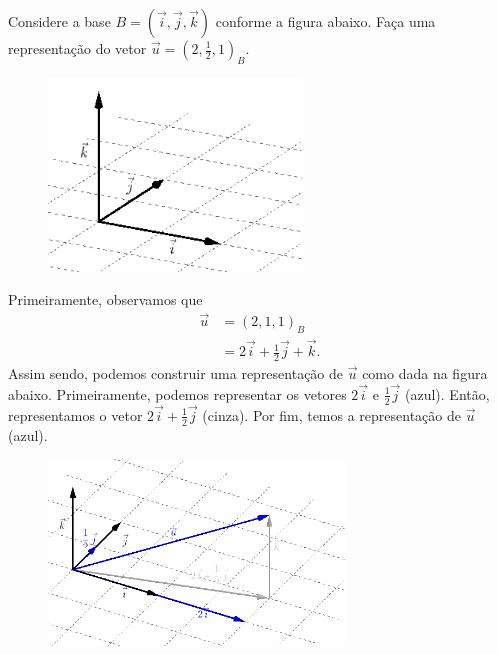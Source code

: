 \begin{exeresol}
  Considere a base $B=(\vec{i}, \vec{j}, \vec{k})$ conforme a figura abaixo. Faça uma representação do vetor $\vec{u}=\left(2,\frac{1}{2},1\right)_B$.
  \begin{figure}[H]
    \centering
    \includegraphics[width=0.6\textwidth]{cap_base/dados/fig_sec_base/repr_geo_exeresol}
  \end{figure}
\end{exeresol}
\begin{resol}
  Primeiramente, observamos que
  \begin{align}
    \vec{u} &= (2,1,1)_B\\
            &= 2\vec{i} + \frac{1}{2}\vec{j} + \vec{k}.
  \end{align}
  Assim sendo, podemos construir uma representação de $\vec{u}$ como dada na figura abaixo. Primeiramente, podemos representar os vetores $2\vec{i}$ e $\frac{1}{2}\vec{j}$ (azul). Então, representamos o vetor $2\vec{i}+\frac{1}{2}\vec{j}$ (cinza). Por fim, temos a representação de $\vec{u}$ (azul).
  \begin{figure}[H]
    \centering
    \includegraphics[width=0.7\textwidth]{cap_base/dados/fig_sec_base/repr_geo_resol}
  \end{figure}
\end{resol}

